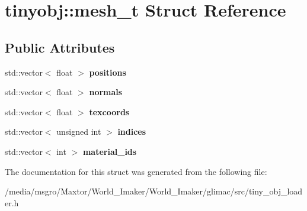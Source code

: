 \hypertarget{structtinyobj_1_1mesh__t}{}\section{tinyobj\+:\+:mesh\+\_\+t Struct Reference}
\label{structtinyobj_1_1mesh__t}
\subsection*{Public Attributes}
\begin{DoxyCompactItemize}
\item 
\mbox{\label{structtinyobj_1_1mesh__t_a3014a27913256384aa283345b69ff2ec}} 
std\+::vector$<$ float $>$ {\bfseries positions}
\item 
\mbox{\label{structtinyobj_1_1mesh__t_a28c2f7eb3114e6ed82a5b7326a4e7a1c}} 
std\+::vector$<$ float $>$ {\bfseries normals}
\item 
\mbox{\label{structtinyobj_1_1mesh__t_a0fc485afc76bcd7e147b22285d7d6575}} 
std\+::vector$<$ float $>$ {\bfseries texcoords}
\item 
\mbox{\label{structtinyobj_1_1mesh__t_aa0a07f40559a650e6917c506d78e298a}} 
std\+::vector$<$ unsigned int $>$ {\bfseries indices}
\item 
\mbox{\label{structtinyobj_1_1mesh__t_a57b2f12dfa3fd620b25babcd3a09ec6b}} 
std\+::vector$<$ int $>$ {\bfseries material\+\_\+ids}
\end{DoxyCompactItemize}


The documentation for this struct was generated from the following file\+:\begin{DoxyCompactItemize}
\item 
/media/msgro/\+Maxtor/\+World\+\_\+\+Imaker/\+World\+\_\+\+Imaker/glimac/src/tiny\+\_\+obj\+\_\+loader.\+h\end{DoxyCompactItemize}
